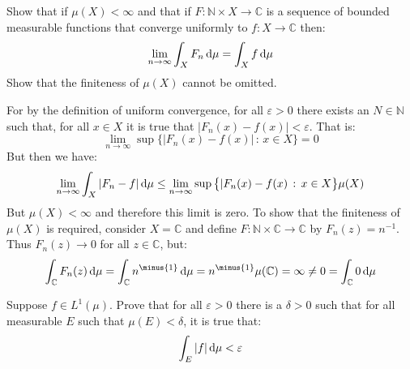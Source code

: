 \documentclass[crop=false,class=article]{standalone}                           %
\begin{document}
        \begin{problem}
            Show that if $\mu(X)<\infty$ and that if
            $F:\mathbb{N}\times{X}\rightarrow\mathbb{C}$ is a sequence of
            bounded measurable functions that converge uniformly to
            $f:X\rightarrow\mathbb{C}$ then:
            \begin{equation}
                \underset{n\rightarrow\infty}{\lim}\int_{X}F_{n}\mathop{}\!\mathrm{d}{\mu}
                =\int_{X}f\mathop{}\!\mathrm{d}{\mu}
            \end{equation}
            Show that the finiteness of $\mu(X)$ cannot be omitted.
        \end{problem}
        \begin{solution}
            For by the definition of uniform convergence, for all
            $\varepsilon>0$ there exists an $N\in\mathbb{N}$ such that, for all
            $x\in{X}$ it is true that $|F_{n}(x)-f(x)|<\varepsilon$. That is:
            \begin{equation}
                \underset{n\rightarrow\infty}{\lim}
                \sup\big\{|F_{n}(x)-f(x)|\,:\,x\in{X}\big\}=0
            \end{equation}
            But then we have:
            \begin{equation}
                \underset{n\rightarrow\infty}{\lim}\int_{X}|F_{n}-f|\mathop{}\!\mathrm{d}{\mu}
                \leq\underset{n\rightarrow\infty}{\lim}
                \sup\big\{|F_{n}(x)-f(x)\,:\,x\in{X}\big\}\mu(X)
            \end{equation}
            But $\mu(X)<\infty$ and therefore this limit is zero. To show that
            the finiteness of $\mu(X)$ is required, consider $X=\mathbb{C}$ and
            define $F:\mathbb{N}\times\mathbb{C}\rightarrow\mathbb{C}$ by
            $F_{n}(z)=n^{\minus{1}}$. Thus $F_{n}(z)\rightarrow{0}$ for all
            $z\in\mathbb{C}$, but:
            \begin{equation}
                \int_{\mathbb{C}}F_{n}(z)\diff{\mu}
                =\int_{\mathbb{C}}n^{\minus{1}}\diff{\mu}
                =n^{\minus{1}}\mu(\mathbb{C})
                =\infty
                \ne{0}
                =\int_{\mathbb{C}}0\diff{\mu}
            \end{equation}
        \end{solution}
        \begin{problem}
            Suppose $f\in{L}^{1}(\mu)$. Prove that for all $\varepsilon>0$ there
            is a $\delta>0$ such that for all measurable $E$ such that
            $\mu(E)<\delta$, it is true that:
            \begin{equation}
                \int_{E}|f|\mathop{}\!\mathrm{d}{\mu}<\varepsilon
            \end{equation}
        \end{problem}
\end{document}

